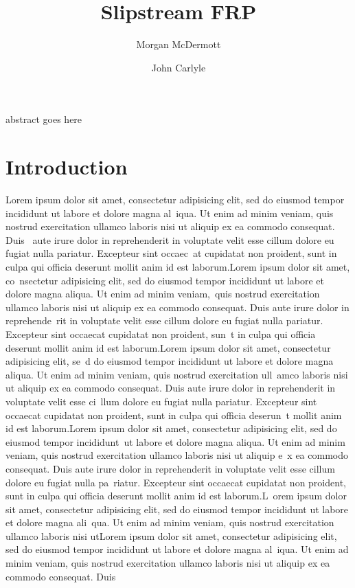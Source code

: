 \documentclass{paper}
\title{Slipstream FRP}
\author[*]{Morgan McDermott}
\author[**]{John Carlyle}
\affil[*]{University of flightless dragons}
\affil[**]{University of angry bees}
\begin{document}
\maketitle
abstract goes here
\twocolumn
\section{Introduction}
Lorem ipsum dolor sit amet, consectetur adipisicing elit, sed do eiusmod tempor incididunt ut labore et dolore magna al\
iqua. Ut enim ad minim veniam, quis nostrud exercitation ullamco laboris nisi ut aliquip ex ea commodo consequat. Duis \
aute irure dolor in reprehenderit in voluptate velit esse cillum dolore eu fugiat nulla pariatur. Excepteur sint occaec\
at cupidatat non proident, sunt in culpa qui officia deserunt mollit anim id est laborum.Lorem ipsum dolor sit amet, co\
nsectetur adipisicing elit, sed do eiusmod tempor incididunt ut labore et dolore magna aliqua. Ut enim ad minim veniam,\
 quis nostrud exercitation ullamco laboris nisi ut aliquip ex ea commodo consequat. Duis aute irure dolor in reprehende\
rit in voluptate velit esse cillum dolore eu fugiat nulla pariatur. Excepteur sint occaecat cupidatat non proident, sun\
t in culpa qui officia deserunt mollit anim id est laborum.Lorem ipsum dolor sit amet, consectetur adipisicing elit, se\
d do eiusmod tempor incididunt ut labore et dolore magna aliqua. Ut enim ad minim veniam, quis nostrud exercitation ull\
amco laboris nisi ut aliquip ex ea commodo consequat. Duis aute irure dolor in reprehenderit in voluptate velit esse ci\
llum dolore eu fugiat nulla pariatur. Excepteur sint occaecat cupidatat non proident, sunt in culpa qui officia deserun\
t mollit anim id est laborum.Lorem ipsum dolor sit amet, consectetur adipisicing elit, sed do eiusmod tempor incididunt\
 ut labore et dolore magna aliqua. Ut enim ad minim veniam, quis nostrud exercitation ullamco laboris nisi ut aliquip e\
x ea commodo consequat. Duis aute irure dolor in reprehenderit in voluptate velit esse cillum dolore eu fugiat nulla pa\
riatur. Excepteur sint occaecat cupidatat non proident, sunt in culpa qui officia deserunt mollit anim id est laborum.L\
orem ipsum dolor sit amet, consectetur adipisicing elit, sed do eiusmod tempor incididunt ut labore et dolore magna ali\
qua. Ut enim ad minim veniam, quis nostrud exercitation ullamco laboris nisi utLorem ipsum dolor sit amet, consectetur adipisicing elit, sed do eiusmod tempor incididunt ut labore et dolore magna al\
iqua. Ut enim ad minim veniam, quis nostrud exercitation ullamco laboris nisi ut aliquip ex ea commodo consequat. Duis \
\end{document}
